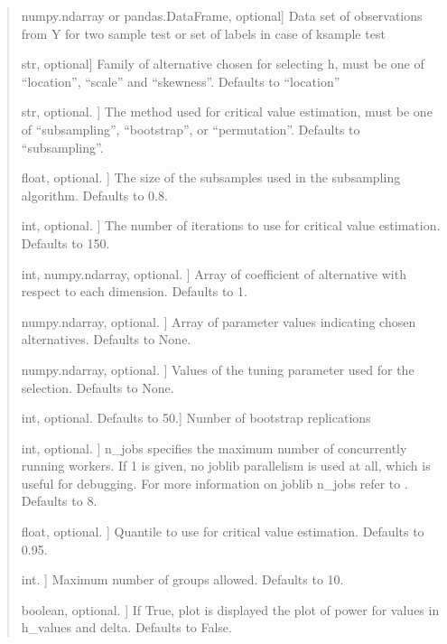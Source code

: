 \documentclass[letterpaper,10pt,english,openany,oneside]{sphinxmanual}
\begin{document}
\begin{fulllineitems}
\begin{quote}
\begin{description}
\sphinxlineitem{y}{[}numpy.ndarray or pandas.DataFrame, optional{]}
\sphinxAtStartPar
Data set of observations from Y for two sample test
or set of labels in case of k\sphinxhyphen{}sample test

\sphinxlineitem{alternative}{[}str, optional{]}
\sphinxAtStartPar
Family of alternative chosen for selecting h,
must be one of “location”, “scale” and “skewness”.
Defaults to “location”

\sphinxlineitem{method}{[}str, optional. {]}
\sphinxAtStartPar
The method used for critical value estimation, 
must be one of “subsampling”, “bootstrap”, or “permutation”.
Defaults to “subsampling”.

\sphinxlineitem{b}{[}float, optional. {]}
\sphinxAtStartPar
The size of the subsamples used in the subsampling algorithm.
Defaults to 0.8.

\sphinxlineitem{num\_iter}{[}int, optional. {]}
\sphinxAtStartPar
The number of iterations to use for critical value estimation.
Defaults to 150.

\sphinxlineitem{delta\_dim}{[}int, numpy.ndarray, optional. {]}
\sphinxAtStartPar
Array of coefficient of alternative with respect to each dimension.
Defaults to 1.

\sphinxlineitem{delta}{[}numpy.ndarray, optional. {]}
\sphinxAtStartPar
Array of parameter values indicating chosen alternatives.
Defaults to None.

\sphinxlineitem{h\_values}{[}numpy.ndarray, optional. {]}
\sphinxAtStartPar
Values of the tuning parameter used for the selection.
Defaults to None.

\sphinxlineitem{n\_rep}{[}int, optional. Defaults to 50.{]}
\sphinxAtStartPar
Number of bootstrap replications

\sphinxlineitem{n\_jobs}{[}int, optional. {]}
\sphinxAtStartPar
n\_jobs specifies the maximum number of concurrently running workers. 
If 1 is given, no joblib parallelism is used at all, 
which is useful for debugging. For more information on joblib n\_jobs 
refer to \sphinxhyphen{} .
Defaults to 8.

\sphinxlineitem{quantile}{[}float, optional. {]}
\sphinxAtStartPar
Quantile to use for critical value estimation. Defaults to 0.95.

\sphinxlineitem{k\_threshold}{[}int. {]}
\sphinxAtStartPar
Maximum number of groups allowed. Defaults to 10.

\sphinxlineitem{power\_plot}{[}boolean, optional. {]}
\sphinxAtStartPar
If True, plot is displayed the plot of power for 
values in h\_values and delta. Defaults to False.


\end{description}
\end{quote}
\end{fulllineitems}
\end{document}
